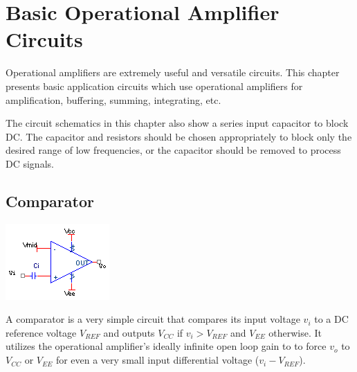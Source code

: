 \chapter{Basic Operational Amplifier Circuits}

Operational amplifiers are extremely useful and versatile circuits.
This chapter presents basic application circuits which use operational amplifiers for amplification, buffering, summing, integrating, etc.

The circuit schematics in this chapter also show a series input capacitor to block DC.
The capacitor and resistors should be chosen appropriately to block only the desired range of low frequencies, or the capacitor should be removed to process DC signals.

\section{Comparator}
\begin{center}
	\includegraphics{schematics/comparator.PNG}
\end{center}
A comparator is a very simple circuit that compares its input voltage $v_{i}$ to a DC reference voltage $V_{REF}$ and outputs $V_{CC}$ if $v_{i} > V_{REF}$ and $V_{EE}$ otherwise. It utilizes the operational amplifier's ideally infinite open loop gain to to force $v_{o}$ to $V_{CC}$ or $V_{EE}$ for even a very small input differential voltage ($v_{i} - V_{REF}$).

